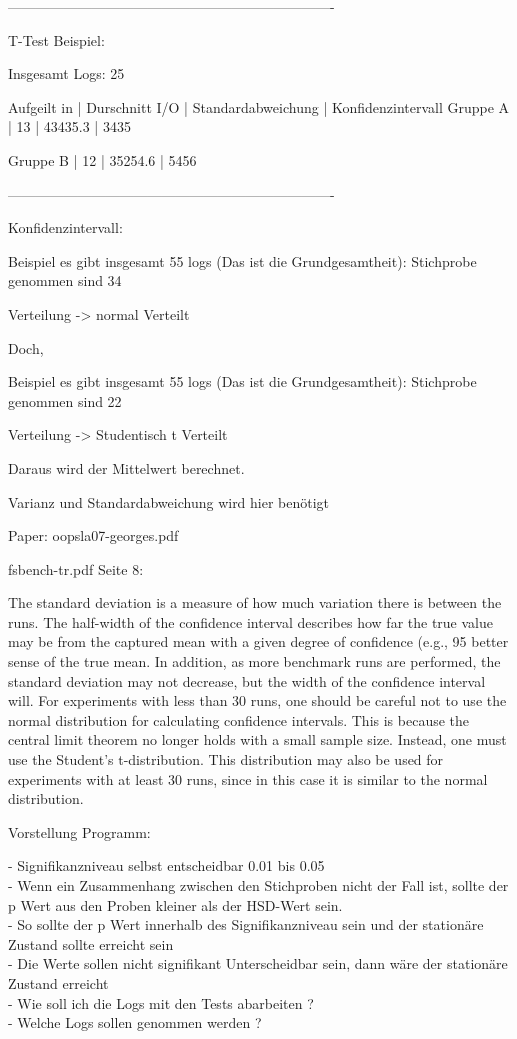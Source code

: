----------------------------------------------------------------------

T-Test Beispiel:

Insgesamt Logs: 25

Aufgeilt in 	| Durschnitt I/O | Standardabweichung | Konfidenzintervall
Gruppe A | 13	| 43435.3	 | 3435

Gruppe B | 12	| 35254.6	 | 5456	

----------------------------------------------------------------------

Konfidenzintervall:

Beispiel es gibt insgesamt 55 logs (Das ist die Grundgesamtheit):
Stichprobe genommen sind 34

Verteilung -> normal Verteilt

Doch,

Beispiel es gibt insgesamt 55 logs (Das ist die Grundgesamtheit):
Stichprobe genommen sind 22

Verteilung -> Studentisch t Verteilt

Daraus wird der Mittelwert berechnet.

Varianz und Standardabweichung wird hier benötigt

Paper: oopsla07-georges.pdf

fsbench-tr.pdf Seite 8:

The standard deviation is a measure of how much variation there is between the
runs. The half-width of the confidence interval describes how far the true value may be
from the captured mean with a given degree of confidence (e.g., 95%
better sense of the true mean. In addition, as more benchmark runs are performed, the
standard deviation may not decrease, but the width of the confidence interval will.
For experiments with less than 30 runs, one should be careful not to use the normal
distribution for calculating confidence intervals. This is because the central limit theorem
no longer holds with a small sample size. Instead, one must use the Student’s t-distribution.
This distribution may also be used for experiments with at least 30 runs, since in this case
it is similar to the normal distribution.

Vorstellung Programm:

- Signifikanzniveau selbst entscheidbar 0.01 bis 0.05 \\
- Wenn ein Zusammenhang zwischen den Stichproben nicht der Fall ist, sollte der p Wert aus den Proben kleiner als der HSD-Wert sein.\\
- So sollte der p Wert innerhalb des Signifikanzniveau sein und der stationäre Zustand sollte erreicht sein\\
- Die Werte sollen nicht signifikant Unterscheidbar sein, dann wäre der stationäre Zustand erreicht\\
- Wie soll ich die Logs mit den Tests abarbeiten ?\\
- Welche Logs sollen genommen werden ? 
